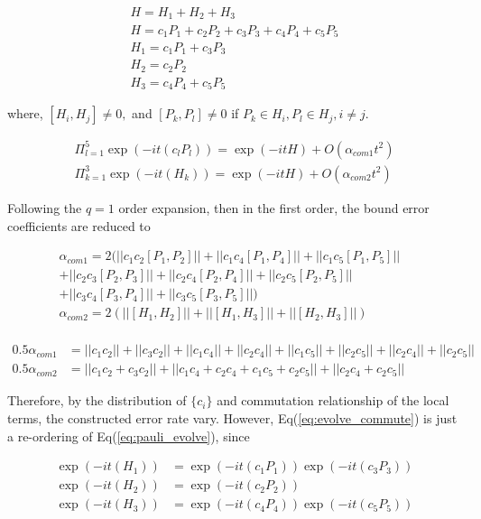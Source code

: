 \documentclass[a4paper,12pt]{article}
\begin{document}
\begin{align}
    H = H_1 + H_2 + H_3  \\
    H =  c_1 P_1 + c_2 P_2 + c_3 P_3 + c_4 P_4 + c_5 P_5\\
    H_1 = c_1 P_1 + c_3 P_3 \\
    H_2 = c_2 P_2\\
    H_3 = c_4 P_4 + c_5 P_5
\end{align}

where, $[H_i, H_j] \neq 0,$ and 
$[P_k, P_l] \neq 0$ if $P_k \in H_i, P_l \in H_j, i \neq j$.

\begin{align}
    \Pi_{l=1}^5 \exp(- i t (c_l P_l)) = \exp(-it H) + O(\alpha_{com 1} t^2)\label{eq:pauli_evolve}\\
    \Pi_{k=1}^3 \exp(- i t (H_k)) = \exp(-it H) + O(\alpha_{com 2} t^2) \label{eq:evolve_commute}
\end{align}


Following the $q=1$ order expansion, then in the first order, the bound error 
coefficients are reduced to 

\begin{align}
    \alpha_{com1} = 2(|| c_1 c_2 [P_1, P_2]|| + || c_1 c_4 [P_1, P_4]|| + || c_1 c_5 [P_1, P_5]||& \\
    + || c_2 c_3 [P_2, P_3]|| + || c_2 c_4 [P_2, P_4]|| + || c_2 c_5 [P_2, P_5]||& \\
    + || c_3 c_4 [P_3, P_4]|| + || c_3 c_5 [P_3, P_5]||)&\\
    \alpha_{com2} = 2(|| [H_1, H_2]|| + || [H_1, H_3]|| + || [H_2, H_3]||)& \\
\end{align}


\begin{align}
    0.5 \alpha_{com1} &= ||c_1 c_2|| + ||c_3 c_2|| + ||c_1 c_4|| + ||c_2 c_4|| + ||c_1 c_5|| + ||c_2 c_5||  + ||c_2 c_4|| + ||c_2 c_5||\\
    0.5 \alpha_{com2} &= ||c_1 c_2 + c_3 c_2|| + ||c_1 c_4 + c_2 c_4 + c_1 c_5 + c_2 c_5||  + ||c_2 c_4 + c_2 c_5||
\end{align}


Therefore, by the distribution of $\{c_i\}$ and commutation relationship of the local terms,
the constructed error rate vary.
However, Eq(\ref{eq:evolve_commute}) is just a re-ordering of Eq(\ref{eq:pauli_evolve}), since 

\begin{align}
    \exp(- i t (H_1)) &= \exp(- i t (c_1 P_1)) \exp(- i t (c_3 P_3)) \\ 
    \exp(- i t (H_2)) &= \exp(- i t (c_2 P_2))\\
    \exp(- i t (H_3)) &= \exp(- i t (c_4 P_4)) \exp(- i t (c_5 P_5)) \\ 
\end{align}
\end{document}
